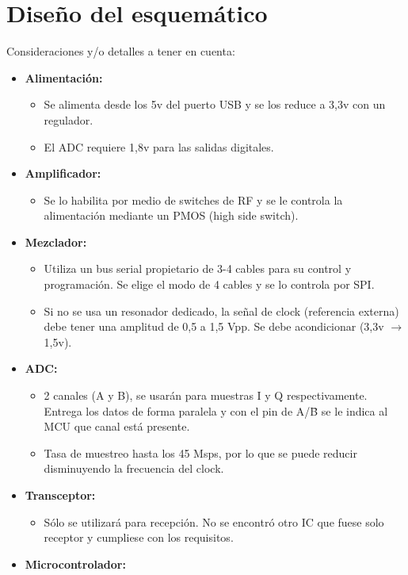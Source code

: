 \documentclass[a4paper,12pt]{report} %
\begin{document}
\chapter{Diseño del esquemático}
Consideraciones y/o detalles a tener en cuenta:
\begin{itemize}
	\item \textbf{Alimentación:}
	\begin{itemize}
		\item Se alimenta desde los 5v del puerto USB y se los reduce a 3,3v con un regulador.
		\item El ADC requiere 1,8v para las salidas digitales.
	\end{itemize}
	\item \textbf{Amplificador:}
	\begin{itemize}
		\item Se lo habilita por medio de switches de RF y se le controla la alimentación mediante un PMOS (high side switch).
	\end{itemize}
	\item \textbf{Mezclador:}
	\begin{itemize}
		\item Utiliza un bus serial propietario de 3-4 cables para su control y programación. Se elige el modo de 4 cables y se lo controla por SPI.
		\item Si no se usa un resonador dedicado, la señal de clock (referencia externa) debe tener una amplitud de 0,5 a 1,5 Vpp. Se debe acondicionar (3,3v $\rightarrow$ 1,5v).
	\end{itemize}	
	\item \textbf{ADC:}	 
	\begin{itemize}
		\item 2 canales (A y B), se usarán para muestras I y Q respectivamente. Entrega los datos de forma paralela y con el pin de A/\={B} se le indica al MCU que canal está presente.
		\item Tasa de muestreo hasta los 45 Msps, por lo que se puede reducir disminuyendo la frecuencia del clock.
	\end{itemize}
	\item \textbf{Transceptor:}
	\begin{itemize}
		\item Sólo se utilizará para recepción. No se encontró otro IC que fuese solo receptor y cumpliese con los requisitos.
	\end{itemize}
	\item \textbf{Microcontrolador:}
	\begin{itemize}

\end{itemize}
\end{itemize}
\end{document}
